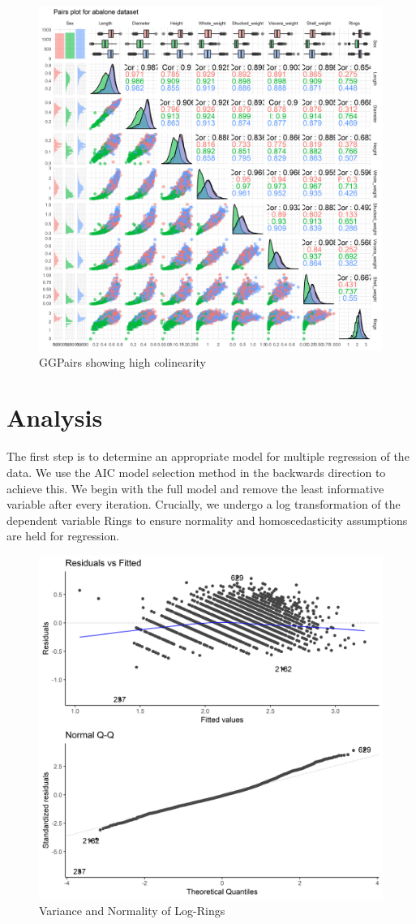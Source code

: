 \documentclass[9pt,twocolumn]{article}
\begin{document}
		\begin{figure}[!htbp]
			\centering
			\includegraphics[width=0.85\columnwidth]{ggpairs}
			\caption{GGPairs showing high colinearity}
			\label{fig:ggpairs}
		\end{figure}
		
		
	\section{Analysis}
	The first step is to determine an appropriate model for multiple regression of the data. We use the AIC model selection method in the backwards direction to achieve this. We begin with the full model and remove the least informative variable after every iteration. Crucially, we undergo a log transformation of the dependent variable Rings to ensure normality and homoscedasticity assumptions are held for regression. 
	
	\begin{figure}[!htbp]
		\centering
		\includegraphics[width=0.7\linewidth]{varnorm}
		\caption{Variance and Normality of Log-Rings}
		\label{fig:varnorm}
	\end{figure}
	
\end{document}
